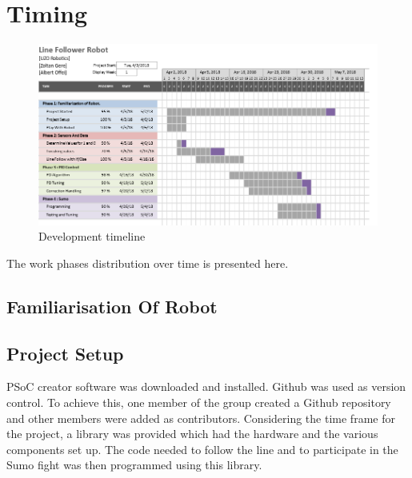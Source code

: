 \documentclass[11pt,a4paper,oneside,article]{memoir}
\begin{document}
\section{Timing}

\begin{figure}[h]
	\centering
	\includegraphics[width=15cm]{illustration/development_timeline}
	\caption{Development timeline}
	\label{fig:dev_timeline}
\end{figure}
The work phases distribution over time is presented here.

\subsection{Familiarisation Of Robot}

\subsection{Project Setup}
PSoC creator software was downloaded and installed. Github was used as version control. To achieve this, one member of the group created a Github repository and other members were added as contributors. Considering the time frame for the project, a library was provided which had the hardware and the various components set up. The code needed to follow the line and to participate in the Sumo fight was then programmed using this library. 
\end{document}

